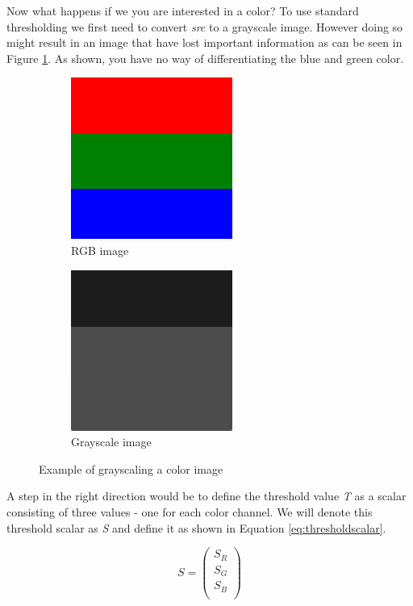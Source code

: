 Now what happens if we you are interested in a color? To use standard thresholding we first need to convert \emph{src} to a grayscale image. However doing so might result in an image that have lost important information as can be seen in Figure \ref{fig:RGB2GRAY}. As shown, you have no way of differentiating the blue and green color.

\begin{figure}
        \centering
        \begin{subfigure}[b]{0.3\textwidth}
                \includegraphics[scale=0.5]{img/RGB}
                \caption{RGB image}
        \end{subfigure}
		\quad
        \begin{subfigure}[b]{0.3\textwidth}
                \includegraphics[scale=0.5]{img/GrayRGB}
                \caption{Grayscale image}
        \end{subfigure}
		\caption{Example of grayscaling a color image}
		\label{fig:RGB2GRAY}
\end{figure}

A step in the right direction would be to define the threshold value \textit{T} as a scalar consisting of three values - one for each color channel. We will denote this threshold scalar as \textit{S} and define it as shown in Equation \ref{eq:thresholdscalar}.

\begin{equation}
S =  
\begin{pmatrix}
  S_{R}\\
  S_{G}\\
  S_{B}\\
\end{pmatrix}
\label{eq:thresholdscalar}
\end{equation}

